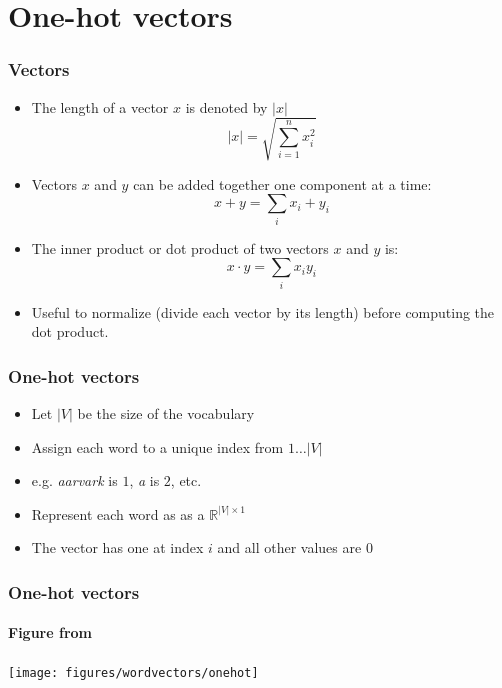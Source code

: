 




\section{One-hot vectors}
\frame{\tableofcontents[currentsection]}

\begin{frame}
\frametitle{Vectors}
\begin{itemize}[<+->]
\item The length of a vector $x$ is denoted by $|x|$
\[ |x| = \sqrt{\sum_{i=1}^n x_i^2} \]

\item Vectors $x$ and $y$ can be added together one component at a time:
\[ x+y = \sum_i x_i + y_i \]

\item The inner product or dot product of two vectors $x$ and $y$ is:
\[ x \cdot y = \sum_i x_i y_i \]

\item Useful to normalize (divide each vector by its length) before computing the dot product.

\end{itemize}
\end{frame}



\begin{frame}
\frametitle{One-hot vectors}
\begin{itemize}[<+->]
\item Let $|V|$ be the size of the vocabulary
\item Assign each word to a unique index from $1 \ldots |V|$
\item e.g. {\em aarvark} is $1$, {\em a} is $2$, etc.
\item Represent each word as as a $\mathbb{R}^{|V|\times 1}$
\item The vector has one at index $i$ and all other values are $0$
\end{itemize}
\end{frame}

\begin{frame}
\frametitle{One-hot vectors}
\framesubtitle{Figure from \cite{cs224n}}
\begin{center}
\texttt{[image: figures/wordvectors/onehot]}	
\end{center}
\end{frame}

